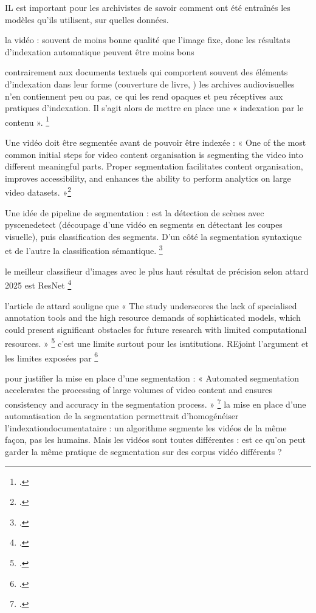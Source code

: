 \begin{itemize}
	IL est important pour les archivistes de savoir comment ont été entraînés les modèles qu'ils utilisent, sur quelles données.
	
	la vidéo : souvent de moins bonne qualité que l'image fixe, donc les résultats d'indexation automatique peuvent être moins bons
	
	contrairement aux documents textuels qui comportent souvent des éléments d'indexation dans leur forme (couverture de livre, ) les archives audiovisuelles n'en contiennent peu ou pas, ce qui les rend opaques et peu réceptives aux pratiques d'indexation. Il s'agit alors de mettre en place une « indexation par le contenu ». \footcite{zotero-item-582} 
	
	Une vidéo doit être segmentée avant de pouvoir être indexée : 
	« One of the most common initial steps for video content organisation is segmenting the video into different meaningful parts. Proper segmentation facilitates content organisation, improves accessibility, and enhances the ability to perform analytics on large video datasets. »\footcite{attard2025}
	
	Une idée de pipeline de segmentation : est la détection de scènes avec pyscenedetect (découpage d'une vidéo en segments en détectant les coupes visuelle), puis classification des segments. D'un côté la segmentation syntaxique et de l'autre la classification sémantique. \footcite{attard2025}
	
	le meilleur classifieur d'images avec le plus haut résultat de précision selon attard 2025 est ResNet
 \footcite{attard2025}
 
l'article de attard souligne que  « The study underscores the lack of specialised annotation tools and the high resource demands of sophisticated models, which could present significant obstacles for future research with limited computational resources. » \footcite{attard2025} c'est une limite surtout pour les isntitutions. REjoint l'argument et les limites exposées par \footcite{sullivan2025}

pour justifier la mise en place d'une segmentation : « Automated segmentation accelerates the processing of large volumes of video content and ensures consistency and accuracy in the segmentation process. » \footcite{attard2025} la mise en place d'une automatisation de la segmentation permettrait d'homogénéiser l'indexationdocumentataire : un algorithme segmente les vidéos de la même façon, pas les humains. Mais les vidéos sont toutes différentes : est ce qu'on peut garder la même pratique de segmentation sur des corpus vidéo différents ?


\end{itemize}
